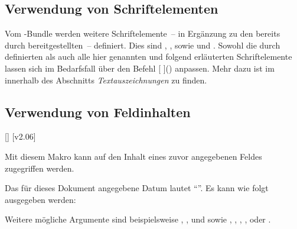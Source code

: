 \begin{DeclareEntity*}{}
\begin{DeclareEntity*}{}
\begin{DeclareEntity*}{}
\subsection{%
  Verwendung von Schriftelementen%
  \label{sec:fonts:elements}%
}

Vom \TUDScript-Bundle werden weitere Schriftelemente~-- in Ergänzung zu den 
bereits durch \KOMAScript{} bereitgestellten~-- definiert. Dies sind 
, ,  sowie 
und . Sowohl die durch \KOMAScript{} definierten als auch 
alle hier genannten und folgend erläuterten Schriftelemente lassen sich im 
Bedarfsfall über den Befehl 
[%
]() anpassen. Mehr dazu ist im \scrguide innerhalb des 
Abschnitts \emph{Textauszeichnungen} zu finden.

\begin{quoting}[rightmargin=0pt]
\begin{Code}
\end{Code}
\end{quoting}



\subsection{%
  Verwendung von Feldinhalten%
}

\begin{Declaration}
  {[]}
  [v2.06]
\printdeclarationlist

Mit diesem Makro kann auf den Inhalt eines zuvor angegebenen Feldes zugegriffen 
werden.
%
\begin{Example}
Das für dieses Dokument angegebene Datum lautet \enquote{}. Es 
kann wie folgt ausgegeben werden:
\begin{Code}
\end{Code}
\end{Example}
%
Weitere mögliche Argumente sind beispielsweise , 
,  und  sowie ,
, , ,  oder
.
\end{Declaration}




\end{DeclareEntity*}
\end{DeclareEntity*}
\end{DeclareEntity*}
